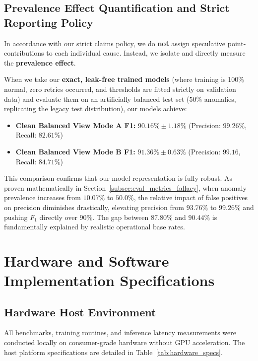 \subsection{Prevalence Effect Quantification and Strict Reporting Policy}
In accordance with our strict claims policy, we do \textbf{not} assign speculative point-contributions to each individual cause. Instead, we isolate and directly measure the \textbf{prevalence effect}.

When we take our \textbf{exact, leak-free trained models} (where training is 100\% normal, zero retries occurred, and thresholds are fitted strictly on validation data) and evaluate them on an artificially balanced test set ($50\%$ anomalies, replicating the legacy test distribution), our models achieve:
\begin{itemize}
    \item \textbf{Clean Balanced View Mode A F1:} $\mathbf{90.16\% \pm 1.18\%}$ (Precision: $99.26\%$, Recall: $82.61\%$)
    \item \textbf{Clean Balanced View Mode B F1:} $\mathbf{91.36\% \pm 0.63\%}$ (Precision: $99.16$, Recall: $84.71\%$)
\end{itemize}

This comparison confirms that our model representation is fully robust. As proven mathematically in Section~\ref{subsec:eval_metrics_fallacy}, when anomaly prevalence increases from $10.07\%$ to $50.0\%$, the relative impact of false positives on precision diminishes drastically, elevating precision from $93.76\%$ to $99.26\%$ and pushing $F_1$ directly over $90\%$. The gap between $87.80\%$ and $90.44\%$ is fundamentally explained by realistic operational base rates.

\section{Hardware and Software Implementation Specifications}
\label{sec:arch_hardware_software}

\subsection{Hardware Host Environment}
All benchmarks, training routines, and inference latency measurements were conducted locally on consumer-grade hardware without GPU acceleration. The host platform specifications are detailed in Table~\ref{tab:hardware_specs}.

